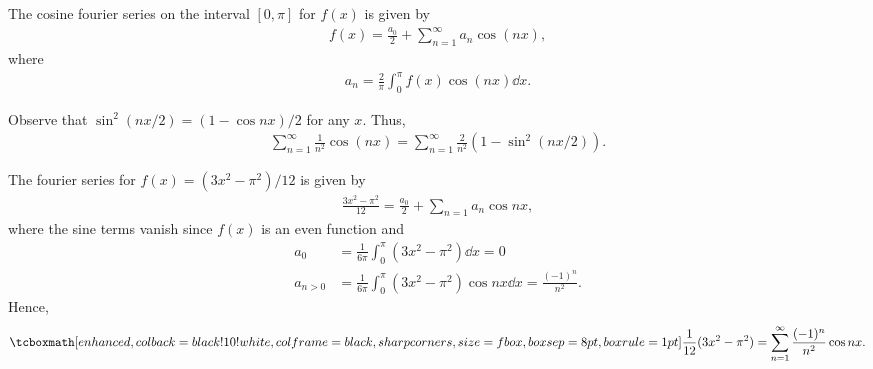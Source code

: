 
The cosine fourier series on the interval $[0,\pi]$ for $f(x)$ is given by
\begin{eqnarray}
    \label{eq:cosine-series}
    f(x) = \frac{a_0}{2} + \sum_{n=1}^{\infty} a_{n}\cos{(nx)}
,\end{eqnarray}
where 
\begin{eqnarray}
    \label{eq:coeffs-cos-series}
    a_{n} = \frac{2}{\pi} \int_{0}^{\pi} f(x) \cos{(nx)} \dd{x}
.\end{eqnarray}

Observe that $\sin^2{(nx/2)} = (1 - \cos{nx})/2$ for any $x$.
Thus, 
\begin{eqnarray}
    \label{eq:sum-rewrite}
    \sum_{n=1}^{\infty} \frac{1}{n^2}\cos{(nx)} = \sum_{n=1}^{\infty} \frac{2}{n^2} (1 - \sin^2{(nx/2)})
.\end{eqnarray}




The fourier series for $f(x) = (3x^2 - \pi^2)/12$ is given by
\begin{eqnarray}
    \label{eq:fourier-series-5}
    \frac{3x^2 - \pi^2}{12} = \frac{a_0}{2} + \sum_{n=1} a_{n}\cos{nx} 
,\end{eqnarray}
where the sine terms vanish since $f(x)$ is an even function and
\begin{align}
    \label{eq:an-coeffs-5}
    a_{0} &= \frac{1}{6\pi} \int_{0}^{\pi} (3x^2 - \pi^2) \dd{x} = 0 \\
    a_{n>0} &= \frac{1}{6\pi} \int_{0}^{\pi} (3x^2 - \pi^2) \cos{nx} \dd{x} = \frac{(-1)^{n}}{n^2}
.\end{align}
Hence,
\begin{eqnarray}
    \label{eq:result-5}
    \eqbox{
    \frac{1}{12}(3x^2 - \pi^2) = \sum_{n=1}^{\infty} \frac{(-1)^{n}}{n^2} \cos{nx}
}
.\end{eqnarray}



